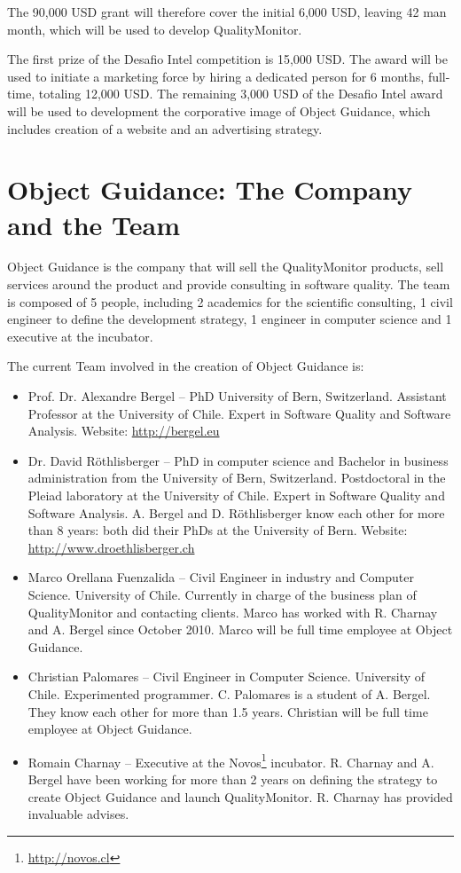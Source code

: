 \documentclass[runningheads]{llncs}
\newcommand{\seclabel}[1]{\label{sec:#1}}
\begin{document}
The 90,000 USD grant will therefore cover the initial 6,000 USD, leaving 42 man month, which will be used to develop QualityMonitor. 

The first prize of the Desafio Intel competition is 15,000 USD. The award will be used to initiate a marketing force by hiring a dedicated person for 6 months, full-time, totaling 12,000 USD. The remaining 3,000 USD of the Desafio Intel award will be used to development the corporative image of Object Guidance, which includes creation of a website and an advertising strategy.

\section{Object Guidance: The Company and the Team} \seclabel{team}

Object Guidance is the company that will sell the QualityMonitor products, sell services around the product and provide consulting in software quality. The team is composed of 5 people, including 2 academics for the scientific consulting, 1 civil engineer to define the development strategy, 1 engineer in computer science and 1 executive at the incubator.

The current Team involved in the creation of Object Guidance is:
\begin{itemize}

\item Prof. Dr. Alexandre Bergel -- PhD University of Bern, Switzerland. Assistant Professor at the University of Chile. Expert in Software Quality and Software Analysis. Website: \url{http://bergel.eu}
\item Dr. David R\"othlisberger -- PhD in computer science and Bachelor in business administration from the University of Bern, Switzerland. Postdoctoral in the Pleiad laboratory at the University of Chile. Expert in Software Quality and Software Analysis. A. Bergel and D. R\"othlisberger know each other for more than 8 years: both did their PhDs at the University of Bern. Website: \url{http://www.droethlisberger.ch}
\item Marco Orellana Fuenzalida -- Civil Engineer in industry and Computer Science. University of Chile. Currently in charge of the business plan of QualityMonitor and contacting clients. Marco has worked with R. Charnay and A. Bergel since October 2010. Marco will be full time employee at Object Guidance.
\item Christian Palomares -- Civil Engineer in Computer Science. University of Chile. Experimented programmer. C. Palomares is a student of A. Bergel. They know each other for more than 1.5 years. Christian will be full time employee at Object Guidance.
\item Romain Charnay -- Executive at the Novos\footnote{\url{http://novos.cl}} incubator. R. Charnay and A. Bergel have been working for more than 2 years on defining the strategy to create Object Guidance and launch QualityMonitor. R. Charnay has provided invaluable advises.
\end{itemize}
\end{document}
